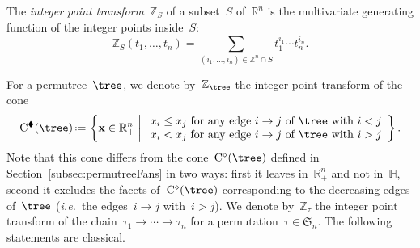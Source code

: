 \documentclass[ALCO]{cedram}
\newcommand{\R}{\mathbb{R}} %
\newcommand{\Z}{\mathbb{Z}} %
\newcommand{\HH}{\mathbb{H}} %
\newcommand{\fS}{\mathfrak{S}} %
\renewcommand{\b}[1]{\mathbf{#1}} %
\newcommand{\set}[2]{\left\{ #1 \;\middle|\; #2 \right\}} %
\newcommand{\eqdef}{\mbox{\,\raisebox{0.2ex}{\scriptsize\ensuremath{\mathrm:}}\ensuremath{=}\,}} %
\newcommand{\polar}{^\diamond} %
\newcommand{\blackPolar}{^\blacklozenge} %
\newcommand{\Cone}{\mathrm{C}} %
\newcommand{\integerPointTransform}{\mathbb{Z}} %
\renewcommand{\ie}{\textit{i.e.}~} %
\newcommand{\darkblue}{\color{darkblue}} %
\newcommand{\defn}[1]{\emph{\darkblue #1}} %
\begin{document}
\begin{definition}
The \defn{integer point transform}~$\integerPointTransform_S$ of a subset~$S$ of~$\R^n$ is the multivariate generating function of the integer points inside~$S$:
\[
\integerPointTransform_S(t_1, \dots, t_n) = \sum_{(i_1, \dots, i_n) \in \Z^n \cap S} t_1^{i_1} \cdots t_n^{i_n}.
\]
\end{definition}

For a permutree~$\tree$, we denote by~$\integerPointTransform_{\tree}$ the integer point transform of the cone
\[
\Cone\blackPolar(\tree) \eqdef \set{\b{x} \in \R_+^n}{\begin{array}{c} x_i \le x_j \text{ for any edge } i \to j \text{ of } \tree \text{ with } i < j \\  x_i < x_j \text{ for any edge } i \to j \text{ of } \tree \text{ with } i > j \end{array}}.
\]
Note that this cone differs from the cone~$\Cone\polar(\tree)$ defined in Section~\ref{subsec:permutreeFans} in two ways: first it leaves in~$\R_+^n$ and not in~$\HH$, second it excludes the facets of~$\Cone\polar(\tree)$ corresponding to the decreasing edges of~$\tree$ (\ie the edges~$i \to j$ with~$i > j$). We denote by~$\integerPointTransform_\tau$ the integer point transform of the chain~$\tau_1 \to \cdots \to \tau_n$ for a permutation~$\tau \in \fS_n$. The following statements are classical.
\end{document}
